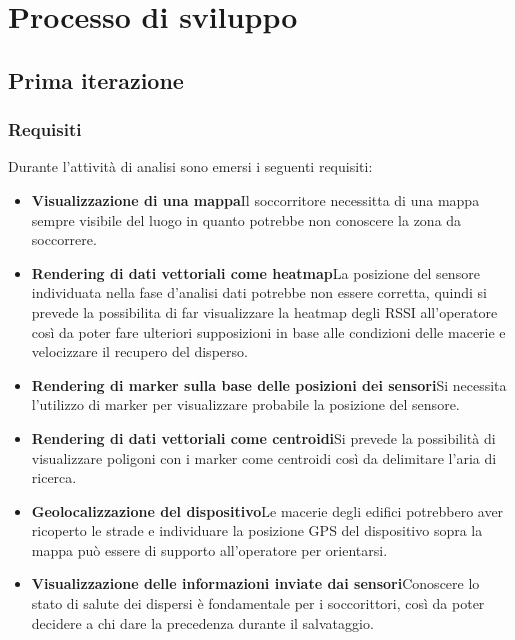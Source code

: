 \documentclass[a4paper]{report}
\begin{document}
\section*{{Processo di sviluppo}}

\subsection*{{Prima iterazione}}

\subsubsection*{{Requisiti}}

Durante l'attività di analisi sono emersi i seguenti requisiti:
\begin{itemize}
    \item \textbf{Visualizzazione di una mappa}\newline Il soccorritore necessitta di una mappa sempre visibile del luogo in quanto potrebbe non conoscere la zona da soccorrere.
    \item \textbf{Rendering di dati vettoriali come heatmap}\newline La posizione del sensore individuata nella fase d'analisi dati potrebbe non essere corretta, quindi si prevede la possibilita di far visualizzare la heatmap degli RSSI all'operatore così da poter fare ulteriori supposizioni in base alle condizioni delle macerie e velocizzare il recupero del disperso.
    \item \textbf{Rendering di marker sulla base delle posizioni dei sensori}\newline Si necessita l'utilizzo di marker per visualizzare probabile la posizione del sensore.
    \item \textbf{Rendering di dati vettoriali come centroidi}\newline Si prevede la possibilità  di visualizzare poligoni con i marker come centroidi così da delimitare l'aria di ricerca.
    \item \textbf{Geolocalizzazione del dispositivo}\newline Le macerie degli edifici potrebbero aver ricoperto le strade e individuare la posizione GPS del dispositivo sopra la mappa può essere di supporto all'operatore per orientarsi.
    \item \textbf{Visualizzazione delle informazioni inviate dai sensori}\newline Conoscere lo stato di salute dei dispersi è fondamentale per i soccorittori, così da poter decidere a chi dare la precedenza durante il salvataggio.

\end{itemize}
\end{document}
